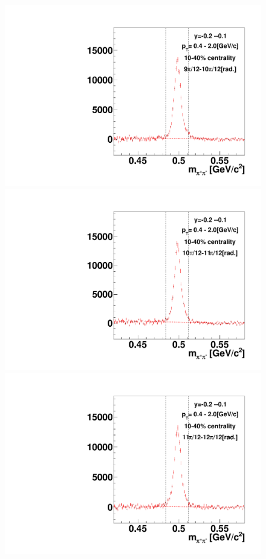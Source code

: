 \begin{figure}[h]
\includegraphics[width=0.14\linewidth]{chapterX/fig/ks_v1_sig/kf_ptslice0_cent1_ks_flow_phi10_rap6.pdf}
\includegraphics[width=0.14\linewidth]{chapterX/fig/ks_v1_sig/kf_ptslice0_cent1_ks_flow_phi11_rap6.pdf}
\includegraphics[width=0.14\linewidth]{chapterX/fig/ks_v1_sig/kf_ptslice0_cent1_ks_flow_phi12_rap6.pdf}


\end{figure}
